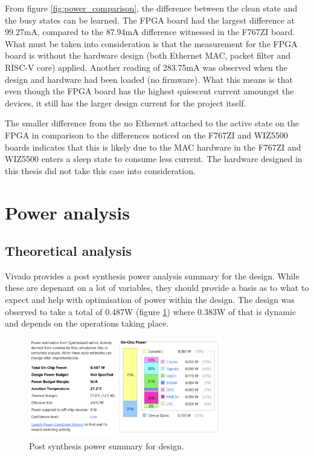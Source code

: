 From figure \ref{fig:power_comparison}, the difference between the clean state and the busy states can be learned. The FPGA board had the largest difference at 99.27mA, compared to the 87.94mA difference witnessed in the F767ZI board. What must be taken into consideration is that the measurement for the FPGA board is without the hardware design (both Ethernet MAC, packet filter and RISC-V core) applied. Another reading of 283.75mA was observed when the design and hardware had been loaded (no firmware). What this means is that even though the FPGA board has the highest quiescent current amoungst the devices, it still has the larger design current for the project itself. 

The smaller difference from the no Ethernet attached to the active state on the FPGA in comparison to the differences noticed on the F767ZI and WIZ5500 boards indicates that this is likely due to the MAC hardware in the F767ZI and WIZ5500 enters a sleep state to consume less current. The hardware designed in this thesis did not take this case into consideration. 





\section{Power analysis}

\subsection{Theoretical analysis }

Vivado provides a post synthesis power analysis summary for the design. While these are depenant on a lot of variables, they should provide a basis as to what to expect and help with optimisation of power within the design. The design was observed to take a total of 0.487W (figure \ref{fig:post_synth_power_summary}) where 0.383W of that is dynamic and depends on the operations taking place. 

\begin{figure}[h]
    \centering
    \includegraphics[width=0.75\textwidth]{Images/power_summary.png}
    \caption[Post synthesis power summary for design]{Post synthesis power summary for design.}
    \label{fig:post_synth_power_summary}
\end{figure}


